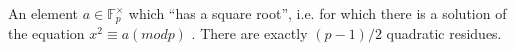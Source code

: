 An element  $ a \in  \ensuremath{\mathbb{F}_p^ \times } $  which ``has a square root'', i.e. 
for which
there is a solution of the equation  $ x^2 \equiv a (mod p) $ .
There are exactly  $ (p-1)/2 $  quadratic residues.

